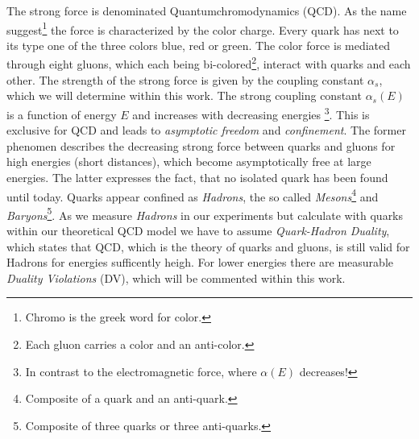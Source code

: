 \documentclass[../../index.tex]{subfiles}
\begin{document}
The strong force is denominated Quantumchromodynamics
(QCD). As the name suggest\footnote{Chromo is the greek word for color.} the
force is characterized by the color charge. Every quark has next to its type one
of the three colors blue, red or green. The color force is mediated through
eight gluons, which each being bi-colored\footnote{Each gluon carries a color
  and an anti-color.}, interact with quarks and each other. The strength of the
strong force is given by the coupling constant $\alpha_s$, which we will
determine within this work. The strong coupling constant $\alpha_s(E)$ is a function of energy $E$ and increases
with decreasing energies \footnote{In contrast to the electromagnetic force, where $\alpha(E)$
  decreases!}. This is exclusive for QCD and leads to \textit{asymptotic freedom} and
\textit{confinement}. The former phenomen describes the decreasing strong force
between quarks and gluons for high energies (short distances), which become asymptotically free at large
energies. The latter expresses the fact, that no isolated quark has been found
until today. Quarks appear confined as \textit{Hadrons}, the so called
\textit{Mesons}\footnote{Composite of a quark and an anti-quark.} and
\textit{Baryons}\footnote{Composite of three quarks or three anti-quarks.}.
As we measure \textit{Hadrons} in our experiments but calculate with quarks
within our theoretical QCD model we have to assume \textit{Quark-Hadron
  Duality}, which states that QCD, which is the theory of quarks and gluons, is still valid for Hadrons for energies
sufficently heigh. For lower energies there are measurable \textit{Duality Violations} (DV), which
will be commented within this work.
\end{document}
